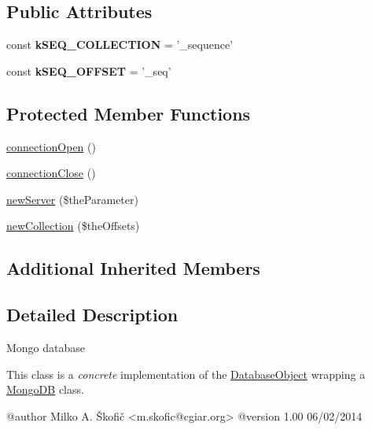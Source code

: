 \subsection*{Public Attributes}
\begin{DoxyCompactItemize}
\item 
\hypertarget{class_ontology_wrapper_1_1_mongo_database_a3d737abcfa3f477fa6b90fcd44cf6952}{const {\bfseries k\-S\-E\-Q\-\_\-\-C\-O\-L\-L\-E\-C\-T\-I\-O\-N} = '\-\_\-sequence'}\label{class_ontology_wrapper_1_1_mongo_database_a3d737abcfa3f477fa6b90fcd44cf6952}

\item 
\hypertarget{class_ontology_wrapper_1_1_mongo_database_a267f9e486b60ce3d63b67c2f215be9f2}{const {\bfseries k\-S\-E\-Q\-\_\-\-O\-F\-F\-S\-E\-T} = '\-\_\-seq'}\label{class_ontology_wrapper_1_1_mongo_database_a267f9e486b60ce3d63b67c2f215be9f2}

\end{DoxyCompactItemize}
\subsection*{Protected Member Functions}
\begin{DoxyCompactItemize}
\item 
\hyperlink{class_ontology_wrapper_1_1_mongo_database_a4b976e0857cbbbfd1fba2b33b7b2512c}{connection\-Open} ()
\item 
\hyperlink{class_ontology_wrapper_1_1_mongo_database_a0960889565708ebe8759388284043d6d}{connection\-Close} ()
\item 
\hyperlink{class_ontology_wrapper_1_1_mongo_database_a770925083b5bad55cd035e8ffba79160}{new\-Server} (\$the\-Parameter)
\item 
\hyperlink{class_ontology_wrapper_1_1_mongo_database_ae0188af7b35915c9672b8106f4194bd9}{new\-Collection} (\$the\-Offsets)
\end{DoxyCompactItemize}
\subsection*{Additional Inherited Members}


\subsection{Detailed Description}
Mongo database

This class is a {\itshape concrete} implementation of the \hyperlink{class_ontology_wrapper_1_1_database_object}{Database\-Object} wrapping a \hyperlink{}{Mongo\-D\-B} class. \begin{DoxyVerb} @author            Milko A. Škofič <m.skofic@cgiar.org>
 @version   1.00 06/02/2014\end{DoxyVerb}
 

